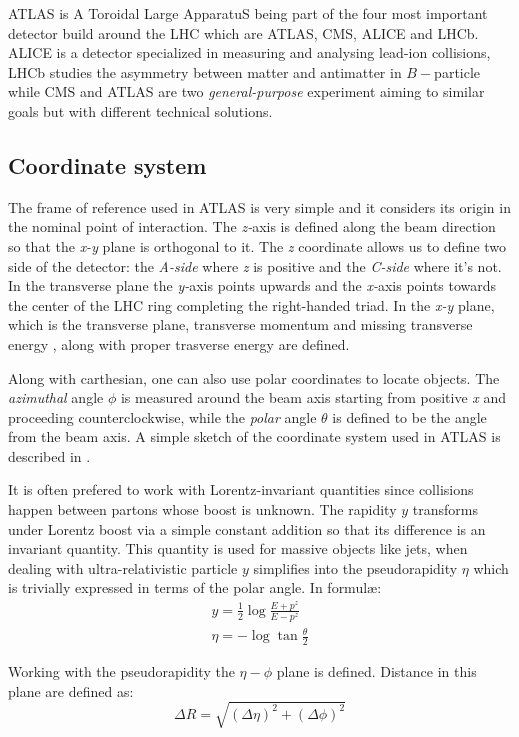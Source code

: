 ATLAS is A Toroidal Large ApparatuS being part of the four most important detector build around the LHC which are ATLAS, CMS, ALICE and LHCb. ALICE is a detector specialized in measuring and analysing lead-ion collisions, LHCb studies the asymmetry between matter and antimatter in $B-$particle while CMS and ATLAS are two \emph{general-purpose} experiment aiming to similar goals but with different technical solutions.

\subsection{Coordinate system}
The frame of reference used in ATLAS is very simple and it considers its origin in the nominal point of interaction. The \emph{z-}axis is defined along the beam direction so that the \emph{x-y} plane is orthogonal to it. The \emph{z} coordinate allows us to define two side of the detector: the \emph{A-side} where \emph{z} is positive and the \emph{C-side} where it's not. In the transverse plane the \emph{y-}axis points upwards and the \emph{x-}axis points towards the center of the LHC ring completing the right-handed triad. In the \emph{x-y} plane, which is the transverse plane, transverse momentum \pt and missing transverse energy \met, along with proper trasverse energy \et are defined.

Along with carthesian, one can also use polar coordinates to locate objects. The \emph{azimuthal} angle $\phi$ is measured around the beam axis starting from positive \emph{x} and proceeding counterclockwise, while the \emph{polar} angle $\theta$ is defined to be the angle from the beam axis. A simple sketch of the coordinate system used in ATLAS is described in \Fig{\ref{fig:coordinate}}.

It is often prefered to work with Lorentz-invariant quantities since collisions happen between partons whose boost is unknown. The rapidity $y$ transforms under Lorentz boost via a simple constant addition so that its difference is an invariant quantity. This quantity is used for massive objects like jets, when dealing with ultra-relativistic particle $y$ simplifies into the pseudorapidity $\eta$ which is trivially expressed in terms of the polar angle. In formul\ae:
\begin{gather}
	y=\frac{1}{2}\log{\frac{E+p^z}{E-p^z}}\\
	\eta=-\log{\tan{\frac{\theta}{2}}}
\end{gather}

Working with the pseudorapidity the $\eta	-\phi$ plane is defined. Distance in this plane are defined as:
\begin{equation}
	\Delta R=\sqrt{\left(\Delta \eta \right)^2 + \left(\Delta \phi \right)^2}
\end{equation}

